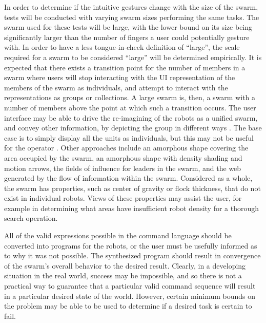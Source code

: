 \documentclass[]{article}
\begin{document}
In order to determine if the intuitive gestures change with the size of the swarm, tests will be conducted with varying swarm sizes performing the same tasks. 
The swarm used for these tests will be large, with the lower bound on its size being significantly larger than the number of fingers a user could potentially gesture with. 
In order to have a less tongue-in-cheek definition of ``large'', the scale required for a swarm to be considered ``large'' will be determined empirically.
It is expected that there exists a transition point for the number of members in a swarm where users will stop interacting with the UI representation of the members of the swarm as individuals, and attempt to interact with the representations as groups or collections. 
A large swarm is, then, a swarm with a number of members above the point at which such a transition occurs. 
The user interface may be able to drive the re-imagining of the robots as a unified swarm, and convey other information, by depicting the group in different ways \cite{manning2015heuristic}.
The base case is to simply display all the units as individuals, but this may not be useful for the operator \cite{coppin2012controlling}. 
Other approaches include an amorphous shape covering the area occupied by the swarm, an amorphous shape with density shading and motion arrows, the fields of influence for leaders in the swarm, and the web generated by the flow of information within the swarm. 
Considered as a whole, the swarm has properties, such as center of gravity or flock thickness, that do not exist in individual robots. 
Views of these properties may assist the user, for example in determining what areas have insufficient robot density for a thorough search operation. 

All of the valid expressions possible in the command language should be converted into programs for the robots, or the user must be usefully informed as to why it was not possible. 
The synthesized program should result in convergence of the swarm's overall behavior to the desired result. 
Clearly, in a developing situation in the real world, success may be impossible, and so there is not a practical way to guarantee that a particular valid command sequence will result in a particular desired state of the world. 
However, certain minimum bounds on the problem may be able to be used to determine if a desired task is certain to fail. %
\end{document}
